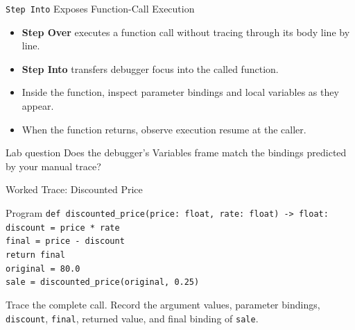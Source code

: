 \documentclass[aspectratio=169,10pt]{beamer}
\begin{document}
\begin{frame}{\texttt{Step Into} Exposes Function-Call Execution}
  \begin{itemize}
    \item \textbf{Step Over} executes a function call without tracing through its body line by line.
    \item \textbf{Step Into} transfers debugger focus into the called function.
    \item Inside the function, inspect parameter bindings and local variables as they appear.
    \item When the function returns, observe execution resume at the caller.
  \end{itemize}

  \begin{block}{Lab question}
    Does the debugger's Variables frame match the bindings predicted by your manual trace?
  \end{block}
\end{frame}

\begin{frame}{Worked Trace: Discounted Price}
  \begin{block}{Program}
    \texttt{def discounted\_price(price: float, rate: float) -> float:}\\
    \hspace*{0.22in}\texttt{discount = price * rate}\\
    \hspace*{0.22in}\texttt{final = price - discount}\\
    \hspace*{0.22in}\texttt{return final}\\[0.08in]
    \texttt{original = 80.0}\\
    \texttt{sale = discounted\_price(original, 0.25)}
  \end{block}

  \begin{activity}
    Trace the complete call. Record the argument values, parameter bindings, \texttt{discount}, \texttt{final}, returned value, and final binding of \texttt{sale}.
  \end{activity}
\end{frame}
\end{document}
